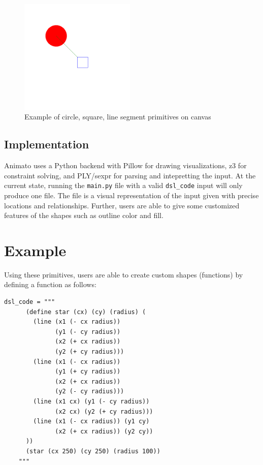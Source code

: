 \documentclass[acmsmall,screen]{acmart}
\begin{document}
\begin{center}
  \begin{figure}[!h]
    \includegraphics[width=0.49\textwidth]{images/primitives.png}
    \caption{Example of circle, square, line segment primitives on canvas}
  \end{figure}
\end{center}

\subsection{Implementation}
Animato uses a Python backend with Pillow for drawing visualizations, z3 for constraint solving, and PLY/sexpr for parsing and intepretting the input.
At the current state, running the \texttt{main.py} file with a valid \texttt{dsl\_code} input will only produce one file.
The file is a visual representation of the input given with precise locations and relationships.
Further, users are able to give some customized features of the shapes such as outline color and fill.

\section{Example}
Using these primitives, users are able to create custom shapes (functions) by defining a function as follows:

\begin{lstlisting}[label=code, caption=Sample custom function definition in Animato]
    dsl_code = """
      (define star (cx) (cy) (radius) (
        (line (x1 (- cx radius))
              (y1 (- cy radius))
              (x2 (+ cx radius))
              (y2 (+ cy radius)))
        (line (x1 (- cx radius))
              (y1 (+ cy radius))
              (x2 (+ cx radius))
              (y2 (- cy radius)))
        (line (x1 cx) (y1 (- cy radius))
              (x2 cx) (y2 (+ cy radius)))
        (line (x1 (- cx radius)) (y1 cy)
              (x2 (+ cx radius)) (y2 cy))
      ))
      (star (cx 250) (cy 250) (radius 100))
    """
\end{lstlisting}
\end{document}

